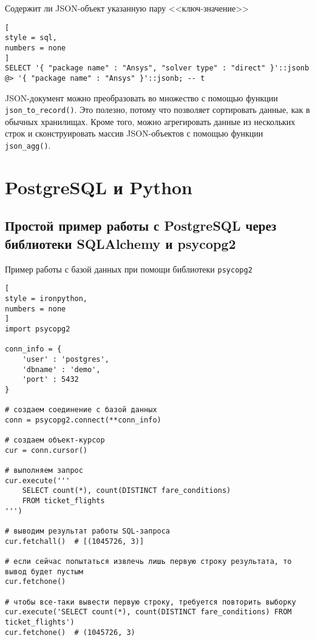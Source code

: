 \documentclass[%
	11pt,
	a4paper,
	utf8,
		]{article}
\begin{document}
Содержит ли JSON-объект указанную пару <<ключ-значение>>
\begin{lstlisting}[
style = sql,
numbers = none
]
SELECT '{ "package name" : "Ansys", "solver type" : "direct" }'::jsonb @> '{ "package name" : "Ansys" }'::jsonb; -- t
\end{lstlisting}

JSON-документ можно преобразовать во множество с помощью функции \texttt{json\_to\_record()}. Это полезно, потому что позволяет сортировать данные, как в обычных хранилищах. Кроме того, можно агрегировать данные из нескольких строк и сконструировать массив JSON-объектов с помощью функции \texttt{json\_agg()}.


\section{PostgreSQL и Python}

\subsection{Простой пример работы с PostgreSQL через библиотеки SQLAlchemy и psycopg2}

Пример работы с базой данных при помощи библиотеки \texttt{psycopg2}
\begin{lstlisting}[
style = ironpython,
numbers = none
]
import psycopg2

conn_info = {
    'user' : 'postgres',
    'dbname' : 'demo',
    'port' : 5432
}

# создаем соединение с базой данных
conn = psycopg2.connect(**conn_info)

# создаем объект-курсор
cur = conn.cursor()

# выполняем запрос
cur.execute('''
    SELECT count(*), count(DISTINCT fare_conditions)
    FROM ticket_flights
''')

# выводим результат работы SQL-запроса
cur.fetchall()  # [(1045726, 3)]

# если сейчас попытаться извлечь лишь первую строку результата, то вывод будет пустым
cur.fetchone()

# чтобы все-таки вывести первую строку, требуется повторить выборку
cur.execute('SELECT count(*), count(DISTINCT fare_conditions) FROM ticket_flights')
cur.fetchone()  # (1045726, 3)
\end{lstlisting}
\end{document}
